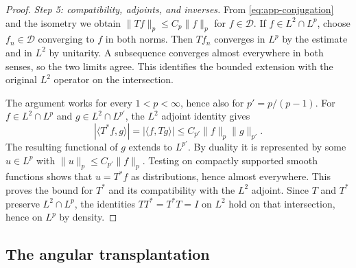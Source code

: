 \documentclass[11pt,a4paper,reqno,backref=page]{amsart}
\numberwithin{equation}{section}
\theoremstyle{definition}
\theoremstyle{remark}
\begin{document}
\begin{proof}
  \emph{Step 5: compatibility, adjoints, and inverses.}
  From \eqref{eq:app-conjugation} and the isometry we obtain
  $\|Tf\|_p\le C_p\|f\|_p$ for $f\in\mathcal D$.
  If $f\in L^2\cap L^p$, choose $f_n\in\mathcal D$
  converging to $f$ in both norms. Then $Tf_n$ converges
  in $L^p$ by the estimate and in $L^2$ by unitarity.
  A subsequence converges almost everywhere in both senses,
  so the two limits agree. This identifies the bounded
  extension with the original $L^2$ operator on the
  intersection.

  The argument works for every $1<p<\infty$, hence also
  for $p'=p/(p-1)$. For $f\in L^2\cap L^p$ and
  $g\in L^2\cap L^{p'}$, the $L^2$ adjoint identity gives
  \begin{equation*}
    |\langle T^*f,g\rangle|
    =|\langle f,Tg\rangle|
    \le C_{p'}\|f\|_p\|g\|_{p'}.
  \end{equation*}
  The resulting functional of $g$ extends to $L^{p'}$.
  By duality it is represented by some $u\in L^p$ with
  $\|u\|_p\le C_{p'}\|f\|_p$. Testing on compactly
  supported smooth functions shows that $u=T^*f$ as
  distributions, hence almost everywhere. This proves the
  bound for $T^*$ and its compatibility with the $L^2$
  adjoint. Since $T$ and $T^*$ preserve $L^2\cap L^p$,
  the identities $TT^{*}=T^{*}T=I$ on $L^2$ hold on that
  intersection, hence on $L^p$ by density.
\end{proof}


\subsection{The angular transplantation}
\end{document}
